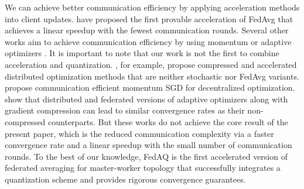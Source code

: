 We can achieve better communication efficiency by applying acceleration methods into client updates. \cite{yuan2020federated} have proposed the first provable acceleration of FedAvg that achieves a linear speedup with the fewest communication rounds. Several other works aim to achieve communication efficiency by using momentum or adaptive optimizers \cite{yu2019linear, karimireddy2020mime, wang2021local}. It is important to note that our work is not the first to combine acceleration and quantization.  \cite{li2020acceleration, li2021canita}, for example, propose compressed and accelerated distributed optimization methods that are neither stochastic nor FedAvg variants. \cite{singh2021squarm} propose communication efficient momentum SGD for decentralized optimization. \cite{li2022distributed, wang2022communication} show that distributed and federated versions of adaptive optimizers along with gradient compression can lead to similar convergence rates as their non-compressed counterparts. But these works do not achieve the core result of the present paper, which is the reduced communication complexity via a faster convergence rate and a linear speedup with the small number of communication rounds. To the best of our knowledge, FedAQ is the first accelerated version of federated averaging for master-worker topology that successfully integrates a quantization scheme and provides rigorous convergence guarantees. 